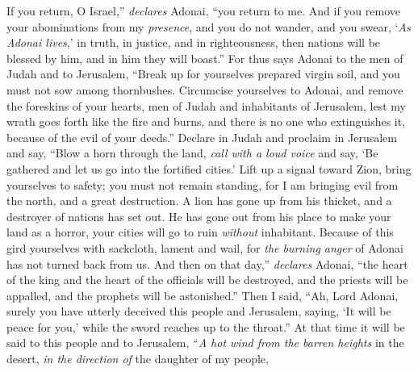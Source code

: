 \begin{biblechapter} %
\verse If you return, O Israel,” \textit{declares} Adonai, 
“you return to me. 
And if you remove your abominations from my \textit{presence}, 
and you do not wander,
\verse and you swear, ‘\textit{As Adonai lives},’ 
in truth, in justice, and in righteousness, 
then nations will be blessed by him, 
and in him they will boast.”
\verse For thus says Adonai 
to the men of Judah and to Jerusalem, 
“Break up for yourselves prepared virgin soil, 
and you must not sow among thornbushes.
\verse Circumcise yourselves to Adonai, 
and remove the foreskins of your hearts, 
men of Judah and inhabitants of Jerusalem, 
lest my wrath goes forth like the fire and burns, 
and there is no one who extinguishes it, 
because of the evil of your deeds.”
 Declare in Judah and proclaim in Jerusalem and say, 
“Blow a horn through the land, 
\textit{call with a loud voice} and say, 
‘Be gathered and let us go into the fortified cities.’
\verse Lift up a signal toward Zion, 
bring yourselves to safety; you must not remain standing, 
for I am bringing evil from the north, 
and a great destruction.
\verse A lion has gone up from his thicket, 
and a destroyer of nations has set out. 
He has gone out from his place to make your land as a horror, 
your cities will go to ruin \textit{without} inhabitant.
\verse Because of this gird yourselves with sackcloth, lament and wail, 
for \textit{the burning anger} of Adonai has not turned back from us.
\verse And then on that day,” \textit{declares} Adonai, 
“the heart of the king and the heart of the officials will be destroyed, 
and the priests will be appalled, 
and the prophets will be astonished.”
\verse Then I said, “Ah, Lord Adonai, surely you have utterly deceived this people and Jerusalem, saying, ‘It will be peace for you,’ while the sword reaches up to the throat.”
\verse At that time it will be said to this people and to Jerusalem, 
“\textit{A hot wind from the barren heights} in the desert, 
\textit{in the direction of} the daughter of my people, 

\end{biblechapter}
